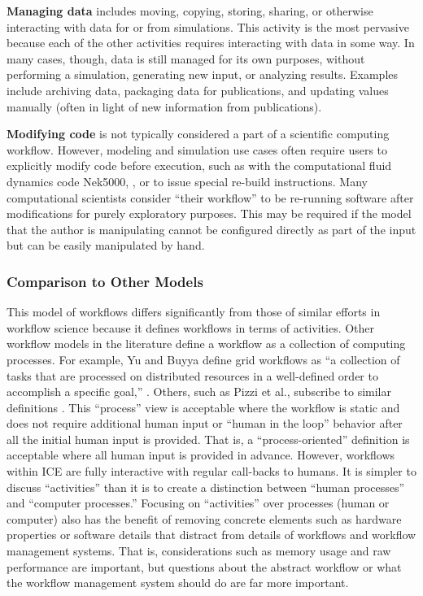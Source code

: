 \textbf{Managing data} includes moving, copying, storing, sharing, or
otherwise interacting with data for or from simulations. This activity
is the most pervasive because each of the other activities requires
interacting with data in some way. In many cases, though, data is still
managed for its own purposes, without performing a simulation,
generating new input, or analyzing results. Examples include archiving
data, packaging data for publications, and updating values manually
(often in light of new information from publications).

\textbf{Modifying code} is not typically considered a part of a
scientific computing workflow. However, modeling and simulation use
cases often require users to explicitly modify code before execution,
such as with the computational fluid dynamics code Nek5000,
\cite{the_nek5000_team_nek5000_2014}, or to issue special re-build instructions.
Many computational scientists consider ``their workflow'' to be re-running
software after modifications for purely exploratory purposes. This may
be required if the model that the author is manipulating cannot be
configured directly as part of the input but can be easily manipulated
by hand.

\subsubsection{Comparison to Other
Models}\label{comparison-to-other-models}

This model of workflows differs significantly from those of similar
efforts in workflow science because it defines workflows in terms of
activities. Other workflow models in the literature define a workflow as
a collection of computing processes. For example, Yu and Buyya define
grid workflows as ``a collection of tasks that are processed on
distributed resources in a well-defined order to accomplish a specific
goal,'' \cite{yu_taxonomy_2005}. Others, such as Pizzi et al., subscribe to
similar definitions \cite{pizzi_aiida:_2016}. This ``process'' view is
acceptable where the workflow is static and does not require additional
human input or ``human in the loop'' behavior after all the initial
human input is provided. That is, a ``process-oriented'' definition is
acceptable where all human input is provided in advance. However,
workflows within ICE are fully interactive with regular call-backs to
humans. It is simpler to discuss ``activities'' than it is to create a
distinction between ``human processes'' and ``computer processes.''
Focusing on ``activities'' over processes (human or computer) also has
the benefit of removing concrete elements such as hardware properties or
software details that distract from details of workflows and workflow 
management systems. That is, considerations such as memory usage and 
raw performance are important, but questions about the abstract workflow 
or what the workflow management system should do are far more important.

